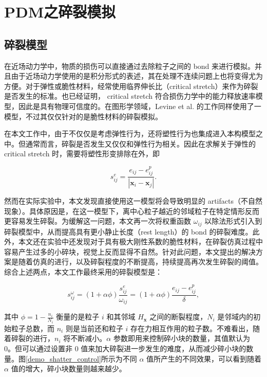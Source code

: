 ﻿\chapter{PDM之碎裂模拟}
\section{碎裂模型}
在近场动力学中，物质的损伤可以直接通过去除粒子之间的 bond 来进行模拟。并且由于近场动力学使用的是积分形式的表述，其在处理不连续问题上也将变得尤为方便。对于弹性或脆性材料，经常使用临界伸长比（critical stretch）来作为碎裂是否发生的标准。也已经证明， critical stretch 符合损伤力学中的能力释放速率模型，因此是具有物理可信度的。在图形学领域，Levine et al. 的工作同样使用了一模型，不过其仅仅针对的是脆性材料的碎裂模拟。

在本文工作中，由于不仅仅是考虑弹性行为，还将塑性行为也集成进入本构模型之中。但通常而言，碎裂是否发生又仅仅和弹性行为相关。因此在求解关于弹性的 critical stretch 时，需要将塑性形变排除在外，即

\begin{equation}
s_{ij}^e =\frac{e_{ij}-e_{ij}^p}{|\mathbf{x}_i-\mathbf{x}_j|}.
\end{equation}

然而在实际实验中，本文发现直接使用这一模型将会导致明显的 artifacts（不自然现象）。具体原因是，在这一模型下，离中心粒子越近的邻域粒子在特定情形反而更容易发生碎裂。为缓解这一问题，本文再一次将权重函数 $\omega_{ij}$ 以除法形式引入到碎裂模型中，从而提高具有更小静止长度（rest length）的 bond 的碎裂难度。此外，本文还在实验中还发现对于具有极大刚性系数的脆性材料，在碎裂仿真过程中容易产生过多的小碎块，视觉上反而显得不自然。针对此问题，本文提出的解决方案是随着仿真的进行，以及碎裂程度的不断提高，持续提高再次发生碎裂的阈值。综合上述两点，本文工作最终采用的碎裂模型是：

\begin{equation}
s_{ij}^\omega = (1 + \alpha\phi)\frac{s_{ij}^e}{\omega_{ij}} = (1 + \alpha\phi)\frac{e_{ij}-e_{ij}^p}{\delta},
\end{equation}

其中 $\phi = 1 - \frac{n_i}{N_i}$ 衡量的是粒子 $i$ 和其邻域 $H_\mathbf{x}$ 之间的断裂程度，$N_i$ 是邻域内的初始粒子总数，而 $n_i$ 则是当前还和粒子 $i$ 存在力相互作用的粒子数。不难看出，随着碎裂的进行，$n_i$ 将不断减小。$\alpha$ 参数即用来控制碎小块的数量，其值默认为 0。但可以通过设置非 0 值来加大碎裂进一步发生的难度，从而减少碎小块的数量。图\ref{demo_shatter_control}所示为不同 $\alpha$ 值所产生的不同效果，可以看到随着 $\alpha$ 值的增大，碎小块数量则越来越少。

